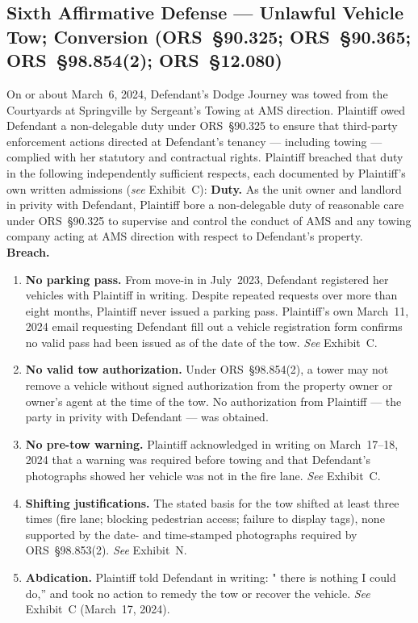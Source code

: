 \documentclass[10pt,letterpaper,oneside]{extarticle}
\begin{document}
\subsection{\textbf{Sixth Affirmative Defense ---
		Unlawful Vehicle Tow; Conversion
		(ORS~\S90.325; ORS~\S90.365;
		ORS~\S98.854(2); ORS~\S12.080)}}
On or about March~6, 2024, Defendant's Dodge Journey was
towed from the Courtyards at Springville by Sergeant's
Towing at AMS direction. Plaintiff owed Defendant a
non-delegable duty under ORS~\S90.325 to ensure that
third-party enforcement actions directed at Defendant's
tenancy --- including towing --- complied with her statutory
and contractual rights. Plaintiff breached that duty in the
following independently sufficient respects, each documented
by Plaintiff's own written admissions
(\textit{see} Exhibit~C):
\textbf{Duty.} As the unit owner and landlord in privity
with Defendant, Plaintiff bore a non-delegable duty of
reasonable care under ORS~\S90.325 to supervise and control
the conduct of AMS and any towing company acting at AMS
direction with respect to Defendant's property.\\
\textbf{Breach.}
\begin{enumerate}[label=(\alph*),leftmargin=.5in,
	itemsep=4pt]
	\item \textbf{No parking pass.} From move-in in
	July~2023, Defendant registered her vehicles with
	Plaintiff in writing. Despite repeated requests over
	more than eight months, Plaintiff never issued a
	parking pass. Plaintiff's own March~11, 2024 email
	requesting Defendant fill out a vehicle registration
	form confirms no valid pass had been issued as of
	the date of the tow. \textit{See} Exhibit~C.
	\item \textbf{No valid tow authorization.} Under
	ORS~\S98.854(2), a tower may not remove a vehicle
	without signed authorization from the property owner
	or owner's agent at the time of the tow. No
	authorization from Plaintiff --- the party in privity
	with Defendant --- was obtained.
	\item \textbf{No pre-tow warning.} Plaintiff
	acknowledged in writing on March~17--18, 2024 that a
	warning was required before towing and that
	Defendant's photographs showed her vehicle was not in
	the fire lane. \textit{See} Exhibit~C.
	\item \textbf{Shifting justifications.} The stated
	basis for the tow shifted at least three times (fire
	lane; blocking pedestrian access; failure to display
	tags), none supported by the date- and
	time-stamped photographs required by
	ORS~\S98.853(2). \textit{See} Exhibit~N.
	\item \textbf{Abdication.} Plaintiff told Defendant
	in writing: "
	there is nothing I could do,'' and
	took no action to remedy the tow or recover the
	vehicle. \textit{See} Exhibit~C (March~17, 2024).
\end{enumerate}
\end{document}

